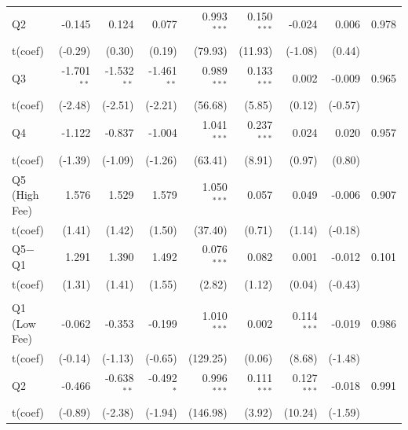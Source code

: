 {\begin{longtable}[t]{lrrrrrrrr}
\hspace{1em}Q2 & -0.145 & 0.124 & 0.077 & 0.993$^{***}$ & 0.150$^{***}$ & -0.024 & 0.006 & 0.978\\
\hspace{1em}t(coef) & (-0.29) & (0.30) & (0.19) & (79.93) & (11.93) & (-1.08) & (0.44) & \\
\hspace{1em}Q3 & -1.701$^{**}$ & -1.532$^{**}$ & -1.461$^{**}$ & 0.989$^{***}$ & 0.133$^{***}$ & 0.002 & -0.009 & 0.965\\
\hspace{1em}t(coef) & (-2.48) & (-2.51) & (-2.21) & (56.68) & (5.85) & (0.12) & (-0.57) & \\
\hspace{1em}Q4 & -1.122 & -0.837 & -1.004 & 1.041$^{***}$ & 0.237$^{***}$ & 0.024 & 0.020 & 0.957\\
\hspace{1em}t(coef) & (-1.39) & (-1.09) & (-1.26) & (63.41) & (8.91) & (0.97) & (0.80) & \\
\hspace{1em}Q5 (High Fee) & 1.576 & 1.529 & 1.579 & 1.050$^{***}$ & 0.057 & 0.049 & -0.006 & 0.907\\
\hspace{1em}t(coef) & (1.41) & (1.42) & (1.50) & (37.40) & (0.71) & (1.14) & (-0.18) & \\
\hspace{1em}Q5$-$Q1 & 1.291 & 1.390 & 1.492 & 0.076$^{***}$ & 0.082 & 0.001 & -0.012 & 0.101\\
\hspace{1em}t(coef) & (1.31) & (1.41) & (1.55) & (2.82) & (1.12) & (0.04) & (-0.43) & \\
\addlinespace[0.3em]
\hline
\multicolumn{9}{l}{Passive --- EW}\\
\hspace{1em}Q1 (Low Fee) & -0.062 & -0.353 & -0.199 & 1.010$^{***}$ & 0.002 & 0.114$^{***}$ & -0.019 & 0.986\\
\hspace{1em}t(coef) & (-0.14) & (-1.13) & (-0.65) & (129.25) & (0.06) & (8.68) & (-1.48) & \\
\hspace{1em}Q2 & -0.466 & -0.638$^{**}$ & -0.492$^{*}$ & 0.996$^{***}$ & 0.111$^{***}$ & 0.127$^{***}$ & -0.018 & 0.991\\
\hspace{1em}t(coef) & (-0.89) & (-2.38) & (-1.94) & (146.98) & (3.92) & (10.24) & (-1.59) & \\

\end{longtable}}
